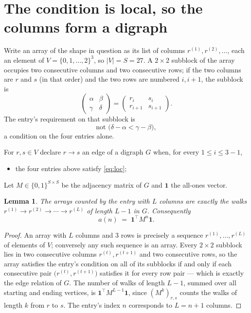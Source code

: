 \documentclass[11pt,a4paper]{article}
\theoremstyle{plain}
\newtheorem{lemma}[theorem]{Lemma}
\theoremstyle{definition}
\begin{document}
\section{The condition is local, so the columns form a digraph}

Write an array of the shape in question as its list of columns
$r^{(1)},r^{(2)},\dots$, each an element of
$V=\{0,1,\dots,2\}^{3}$, so $|V|=S=27$. A $2\times2$ subblock of the array
occupies two consecutive columns and two consecutive rows; if the two columns are $r$
and $s$ (in that order) and the two rows are numbered $i,i+1$,
the subblock is
\[
\begin{pmatrix}\alpha&\beta\\\gamma&\delta\end{pmatrix}=\begin{pmatrix}r_i&s_i\\r_{i+1}&s_{i+1}\end{pmatrix}.
\]
The entry's requirement on that subblock is
\begin{equation}\label{eq:loc}
\text{not }\bigl(\delta-\alpha<\gamma-\beta\bigr),
\end{equation}
a condition on the four entries alone.

For $r,s\in V$ declare $r\to s$ an edge of a digraph $G$ when, for every
$1\le i\le 3-1$,
\begin{itemize}
\item the four entries above satisfy \eqref{eq:loc};

\end{itemize}
Let $M\in\{0,1\}^{S\times S}$ be the adjacency matrix of $G$ and $\mathbf{1}$ the
all-ones vector.

\begin{lemma}\label{lem:walk}
The arrays counted by the entry with $L$ columns are exactly the walks
$r^{(1)}\to r^{(2)}\to\cdots\to r^{(L)}$ of length $L-1$ in $G$. Consequently
\[
a(n)\;=\;\mathbf{1}^{\!\top}M^{n}\mathbf{1} .
\]
\end{lemma}

\begin{proof}
An array with $L$ columns and $3$ rows is precisely a sequence
$r^{(1)},\dots,r^{(L)}$ of elements of $V$; conversely any such sequence is an array.
Every $2\times2$ subblock lies in two consecutive columns $r^{(t)},r^{(t+1)}$ and two
consecutive rows, so the array satisfies the entry's condition on all of its subblocks
if and only if each consecutive pair $\bigl(r^{(t)},r^{(t+1)}\bigr)$ satisfies it for
every row pair --- which is exactly the edge relation of $G$. The number of walks of
length $L-1$, summed over all starting and ending vertices, is
$\mathbf{1}^{\!\top}M^{L-1}\mathbf{1}$, since $(M^{k})_{r,s}$ counts the walks of
length $k$ from $r$ to $s$. The entry's index $n$ corresponds to $L=n+1$ columns.
\end{proof}
\end{document}
